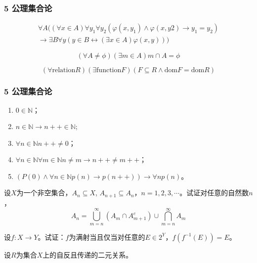 \documentclass{beamer}
\begin{document}
\begin{CJK*}{UTF8}{gbsn}
\begin{frame}
  \frametitle{5 公理集合论}
    \begin{Ax}[代换公理]
    \begin{equation*}
      \begin{split}
      \forall A ((\forall x \in A) \forall y_1 \forall y_2 (\varphi(x, y_1) \land \varphi(x, y2) \rightarrow y_1 = y_2)\\
      \rightarrow \exists B \forall y (y \in B \leftrightarrow (\exists x \in A) \varphi(x, y)))
    \end{split}
  \end{equation*}
  \end{Ax}
  \begin{Ax}[正则公理]
    \begin{equation*}
      (\forall A \neq \phi) (\exists m \in A) m \cap A = \phi
    \end{equation*}
  \end{Ax}
  \begin{Ax}[选择公理]
    \begin{equation*}
      (\forall \text{relation} R)
      (\exists \text{function} F)
      (F \subseteq R \land
      \text{dom} F
      = \text{dom} R)
    \end{equation*}
  \end{Ax}
\end{frame}

\begin{frame}
  \frametitle{5 公理集合论}
  \begin{enumerate}
  \item $0 \in \mathbb{N}$；
  \item $n \in \mathbb{N} \rightarrow n ++ \in \mathbb{N}$;
  \item $\forall n \in \mathbb{N} n ++ \neq 0$；
  \item $\forall n \in \mathbb{N} \forall m \in \mathbb{N} n \neq m \rightarrow n ++ \neq m ++$；
    \item $(P(0) \land \forall n \in \mathbb{N} p(n) \rightarrow p(n++) )\rightarrow \forall n p(n)$。 
  \end{enumerate}
\end{frame}

\begin{frame}
  \begin{Exercise}[P20-5]
    设$X$为一个非空集合，$A_n\subseteq X$, $A_{n+1}\subseteq A_n$，$n=1,2,3,\cdots$。试证对任意的自然数$n$，
    \[A_n=\bigcup_{m=n}^{\infty}(A_m\cap A_{m+1}^c)\cup \bigcap_{m=n}^{\infty}A_m\]
  \end{Exercise}
\end{frame}
\begin{frame}
  \begin{Exercise}[P47-5]
    设$f:X\to Y$。试证：$f$为满射当且仅当对任意的$E\in 2^Y$，$f(f^{-1}(E))=E$。
  \end{Exercise}
\end{frame}
\begin{frame}
  \begin{Exercise}[P126-6]
    设$R$为集合$X$上的自反且传递的二元关系。


\end{Exercise}
\end{frame}
\end{CJK*}
\end{document}

